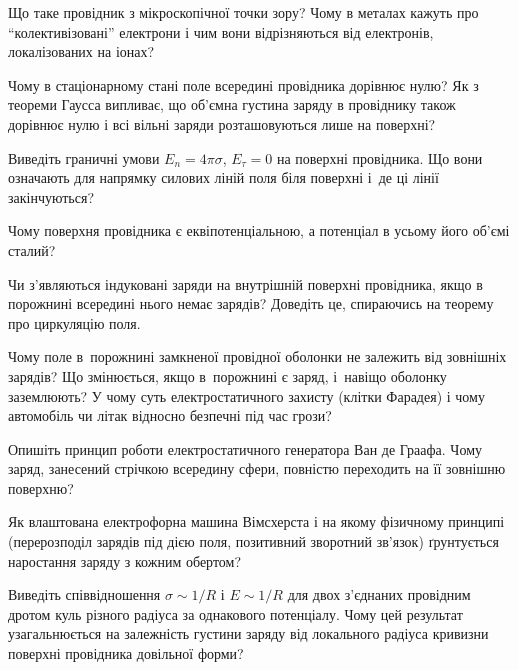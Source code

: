 \begin{Questions}
    \begin{quizlist}
        \item Що таке провідник з мікроскопічної точки зору? Чому в металах кажуть про \enquote{колективізовані} електрони і чим вони відрізняються від електронів, локалізованих на іонах?
        \item Чому в стаціонарному стані поле всередині провідника дорівнює нулю? Як з теореми Гаусса випливає, що об'ємна густина заряду в провіднику також дорівнює нулю і всі вільні заряди розташовуються лише на поверхні?
        \item Виведіть граничні умови $E_n = 4\pi\sigma$, $E_\tau = 0$ на поверхні провідника. Що вони означають для напрямку силових ліній поля біля поверхні і~де ці лінії закінчуються?
        \item Чому поверхня провідника є еквіпотенціальною, а потенціал в усьому його об'ємі сталий?
        \item Чи з'являються індуковані заряди на внутрішній поверхні провідника, якщо в порожнині всередині нього немає зарядів? Доведіть це, спираючись на теорему про циркуляцію поля.
        \item Чому поле в~порожнині замкненої провідної оболонки не залежить від зовнішніх зарядів? Що змінюється, якщо в~порожнині є заряд, і~навіщо оболонку заземлюють? У чому суть електростатичного захисту (клітки Фарадея) і чому автомобіль чи літак відносно безпечні під час грози?
        \item Опишіть принцип роботи електростатичного генератора Ван де Граафа. Чому заряд, занесений стрічкою всередину сфери, повністю переходить на її зовнішню поверхню?
        \item Як влаштована електрофорна машина Вімсхерста і на якому фізичному принципі (перерозподіл зарядів під дією поля, позитивний зворотний зв'язок) ґрунтується наростання заряду з кожним обертом?
        \item Виведіть співвідношення $\sigma \sim 1/R$ і $E\sim1/R$ для двох з'єднаних провідним дротом куль різного радіуса за однакового потенціалу. Чому цей результат узагальнюється на залежність густини заряду від локального радіуса кривизни поверхні провідника довільної форми?

\end{quizlist}
\end{Questions}
